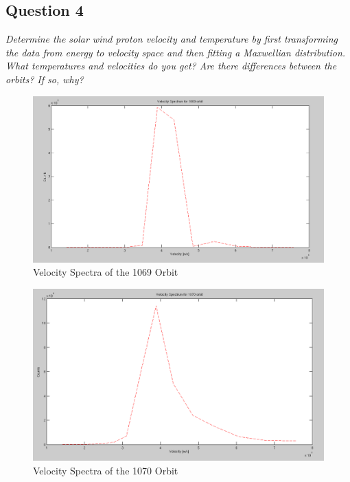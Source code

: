 \documentclass{article}
\begin{document}
\subsection{Question 4}
\textit{Determine the solar wind proton velocity and temperature by first transforming the
data from energy to velocity space and then fitting a Maxwellian distribution. What
temperatures and velocities do you get? Are there differences between the orbits? If
so, why?}

\begin{figure}[!ht]
\centering
\includegraphics[scale=0.35]{Figures/velocity_spectra_1069.png}
\caption{Velocity Spectra of the 1069 Orbit}
\label{fig:Velocity_spectra_1069}
\end{figure}

\begin{figure}
\centering
\includegraphics[scale=0.35]{Figures/velocity_spectra_1070.png}
\caption{Velocity Spectra of the 1070 Orbit}
\label{fig:Velocity_spectra_1070}
\end{figure}
\end{document}
